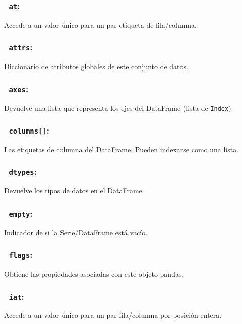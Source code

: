         \subsubsection{~\hspace{2em}\texttt{at}:} Accede a un valor único para un par etiqueta de fila/columna.

        \subsubsection{~\hspace{2em}\texttt{attrs}:} Diccionario de atributos globales de este conjunto de datos.

        \subsubsection{~\hspace{2em}\texttt{axes}:} Devuelve una lista que representa los ejes del DataFrame (lista de \texttt{Index}).

        \subsubsection{~\hspace{2em}\texttt{columns[]}:} Las etiquetas de columna del DataFrame. Pueden indexarse como una lista.

        \subsubsection{~\hspace{2em}\texttt{dtypes}:} Devuelve los tipos de datos en el DataFrame.

        \subsubsection{~\hspace{2em}\texttt{empty}:} Indicador de si la Serie/DataFrame está vacío.

        \subsubsection{~\hspace{2em}\texttt{flags}:} Obtiene las propiedades asociadas con este objeto pandas.

        \subsubsection{~\hspace{2em}\texttt{iat}:} Accede a un valor único para un par fila/columna por posición entera.

